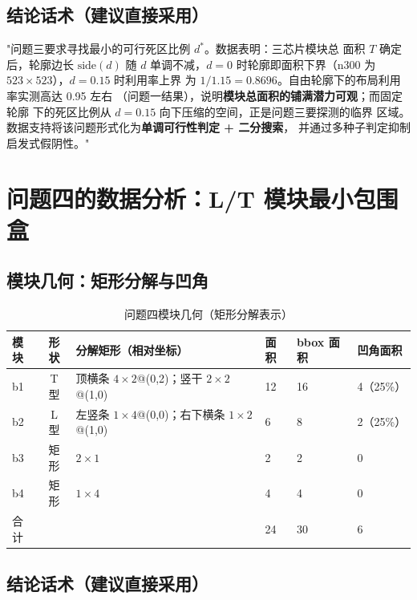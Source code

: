 \documentclass[12pt,a4paper]{article}
\begin{document}
\subsection{结论话术（建议直接采用）}

"问题三要求寻找最小的可行死区比例 $d^*$。数据表明：三芯片模块总
面积 $T$ 确定后，轮廓边长 $\text{side}(d)$ 随 $d$ 单调不减，$d=0$
时轮廓即面积下界（n300 为 $523\times523$），$d=0.15$ 时利用率上界
为 $1/1.15=0.8696$。自由轮廓下的布局利用率实测高达 0.95 左右
（问题一结果），说明\textbf{模块总面积的铺满潜力可观}；而固定轮廓
下的死区比例从 $d=0.15$ 向下压缩的空间，正是问题三要探测的临界
区域。数据支持将该问题形式化为\textbf{单调可行性判定 + 二分搜索}，
并通过多种子判定抑制启发式假阴性。"

\section{问题四的数据分析：L/T 模块最小包围盒}

\subsection{模块几何：矩形分解与凹角}

\begin{table}[H]
\centering
\scriptsize
\setlength{\tabcolsep}{3pt}
\caption{问题四模块几何（矩形分解表示）}
\begin{tabular}{lcllll}
\toprule
模块 & 形状 & 分解矩形（相对坐标） & 面积 & bbox 面积 & 凹角面积 \\
\midrule
b1 & T 型 & 顶横条 $4\times2$@(0,2)；竖干 $2\times2$@(1,0) & 12 & 16 & 4（25\%） \\
b2 & L 型 & 左竖条 $1\times4$@(0,0)；右下横条 $1\times2$@(1,0) & 6 & 8 & 2（25\%） \\
b3 & 矩形 & $2\times1$ & 2 & 2 & 0 \\
b4 & 矩形 & $1\times4$ & 4 & 4 & 0 \\
\midrule
合计 & & & 24 & 30 & 6 \\
\bottomrule
\end{tabular}
\end{table}

\subsection{结论话术（建议直接采用）}
\end{document}
